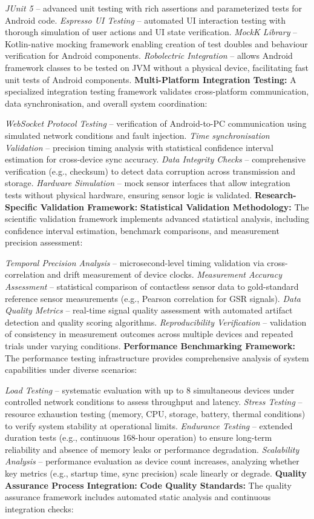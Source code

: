 \documentclass[11pt,a4paper]{report}
\begin{document}
\textit{JUnit 5} – advanced unit testing with rich assertions and parameterized tests for Android code.
\textit{Espresso UI Testing} – automated UI interaction testing with thorough simulation of user actions and UI state verification.
\textit{MockK Library} – Kotlin-native mocking framework enabling creation of test doubles and behaviour verification for Android components.
\textit{Robolectric Integration} – allows Android framework classes to be tested on JVM without a physical device, facilitating fast unit tests of Android components.
\textbf{Multi-Platform Integration Testing:} A specialized integration testing framework validates cross-platform communication, data synchronisation, and overall system coordination:

\textit{WebSocket Protocol Testing} – verification of Android-to-PC communication using simulated network conditions and fault injection.
\textit{Time synchronisation Validation} – precision timing analysis with statistical confidence interval estimation for cross-device sync accuracy.
\textit{Data Integrity Checks} – comprehensive verification (e.g., checksum) to detect data corruption across transmission and storage.
\textit{Hardware Simulation} – mock sensor interfaces that allow integration tests without physical hardware, ensuring sensor logic is validated.
\textbf{Research-Specific Validation Framework:}
\textbf{Statistical Validation Methodology:} The scientific validation framework implements advanced statistical analysis, including confidence interval estimation, benchmark comparisons, and measurement precision assessment:

\textit{Temporal Precision Analysis} – microsecond-level timing validation via cross-correlation and drift measurement of device clocks.
\textit{Measurement Accuracy Assessment} – statistical comparison of contactless sensor data to gold-standard reference sensor measurements (e.g., Pearson correlation for GSR signals).
\textit{Data Quality Metrics} – real-time signal quality assessment with automated artifact detection and quality scoring algorithms.
\textit{Reproducibility Verification} – validation of consistency in measurement outcomes across multiple devices and repeated trials under varying conditions.
\textbf{Performance Benchmarking Framework:} The performance testing infrastructure provides comprehensive analysis of system capabilities under diverse scenarios:

\textit{Load Testing} – systematic evaluation with up to 8 simultaneous devices under controlled network conditions to assess throughput and latency.
\textit{Stress Testing} – resource exhaustion testing (memory, CPU, storage, battery, thermal conditions) to verify system stability at operational limits.
\textit{Endurance Testing} – extended duration tests (e.g., continuous 168-hour operation) to ensure long-term reliability and absence of memory leaks or performance degradation.
\textit{Scalability Analysis} – performance evaluation as device count increases, analyzing whether key metrics (e.g., startup time, sync precision) scale linearly or degrade.
\textbf{Quality Assurance Process Integration:}
\textbf{Code Quality Standards:} The quality assurance framework includes automated static analysis and continuous integration checks:
\end{document}
